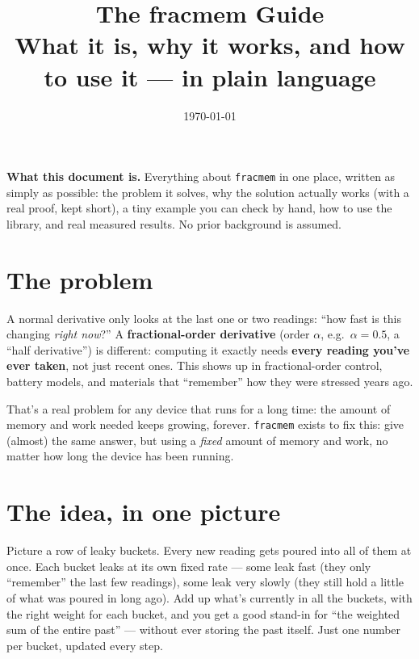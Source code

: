 \documentclass[11pt]{article}
\title{\textbf{The fracmem Guide}\\[0.3em]
\large What it is, why it works, and how to use it --- in plain language}
\author{}
\date{\today}
\begin{document}
\maketitle

\begin{cbox}
\textbf{What this document is.} Everything about \texttt{fracmem} in one place, written as simply as possible: the problem it solves, why the solution actually works (with a real proof, kept short), a tiny example you can check by hand, how to use the library, and real measured results. No prior background is assumed.
\end{cbox}

\tableofcontents

\section{The problem}

A normal derivative only looks at the last one or two readings: ``how fast is this changing \emph{right now}?'' A \textbf{fractional-order derivative} (order $\alpha$, e.g.\ $\alpha=0.5$, a ``half derivative'') is different: computing it exactly needs \textbf{every reading you've ever taken}, not just recent ones. This shows up in fractional-order control, battery models, and materials that ``remember'' how they were stressed years ago.

That's a real problem for any device that runs for a long time: the amount of memory and work needed keeps growing, forever. \texttt{fracmem} exists to fix this: give (almost) the same answer, but using a \emph{fixed} amount of memory and work, no matter how long the device has been running.

\section{The idea, in one picture}

Picture a row of leaky buckets. Every new reading gets poured into all of them at once. Each bucket leaks at its own fixed rate --- some leak fast (they only ``remember'' the last few readings), some leak very slowly (they still hold a little of what was poured in long ago). Add up what's currently in all the buckets, with the right weight for each bucket, and you get a good stand-in for ``the weighted sum of the entire past'' --- without ever storing the past itself. Just one number per bucket, updated every step.
\end{document}
